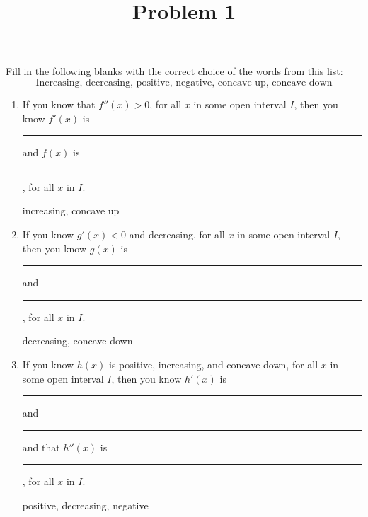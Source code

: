\documentclass{ximera}
\title[Problem 1]{Problem 1}
\begin{document}
\begin{abstract} \end{abstract}
\maketitle


\begin{problem}
Fill in the following blanks with the correct choice of the words from this list:
$$ \text{Increasing, decreasing, positive, negative, concave up, concave down} $$

	\begin{enumerate}
	
	\item  If you know  that  $f''(x) > 0$, for all $x$ in some open interval $I$, then you know $f'(x)$ is \rule{2in}{0.7mm} 
	and $f(x)$ is \rule{2in}{0.7mm}, for all $x$ in $I$.
\begin{explanation}
		increasing, concave up
		\end{explanation}
		
			
				
	\item  If you know $g'(x) < 0$ and decreasing, for all $x$ in some open interval $I$, then you know $g(x)$ is \rule{2in}{0.7mm} and \rule{2in}{0.7mm}, for all $x$ in $I$.
\begin{explanation}
		decreasing, concave down
		\end{explanation}
		
			
				
	\item  If you know $h(x)$ is positive, increasing, and concave down, for all $x$ in some open interval $I$, then you know 
	$h'(x)$ is \rule{2in}{0.7mm} and \rule{2in}{0.7mm} and that 
	$h''(x)$ is \rule{2in}{0.7mm}, for all $x$ in $I$.

		\begin{explanation}
		positive, decreasing, negative
		\end{explanation}
		
			
				
	\end{enumerate}	
		
\end{problem}
\end{document}
